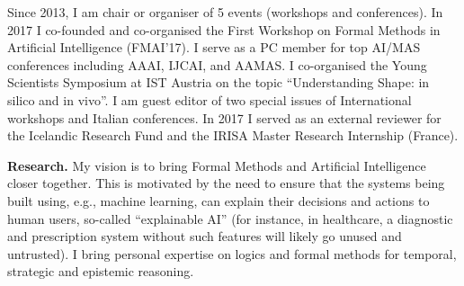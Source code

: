 \documentclass[10,a4paper,sans]{moderncv}
\begin{document}
Since 2013, I am chair or organiser of 5 events (workshops and conferences). In 2017 I co-founded and co-organised the 
First Workshop on Formal Methods in Artificial Intelligence (FMAI'17). I serve as a PC member for top AI/MAS conferences including AAAI, IJCAI, and AAMAS. I co-organised the Young Scientists Symposium at IST Austria on the topic ``Understanding Shape: in silico and in vivo''. I am guest editor of two special issues of International workshops and Italian conferences. 
In 2017 I served as an external reviewer for the Icelandic Research Fund and the IRISA Master Research Internship (France).


% 
% 
% 




\textbf{Research.}
My vision is to bring Formal Methods and Artificial Intelligence closer together. This is motivated by the need to ensure that the systems being built using, e.g.,  machine learning, can explain their decisions and actions to human users, so-called ``explainable AI'' (for instance, in healthcare, a diagnostic and prescription system without such features will likely go unused and untrusted). I bring personal expertise on logics and formal methods for temporal, strategic and epistemic reasoning.
\end{document}
